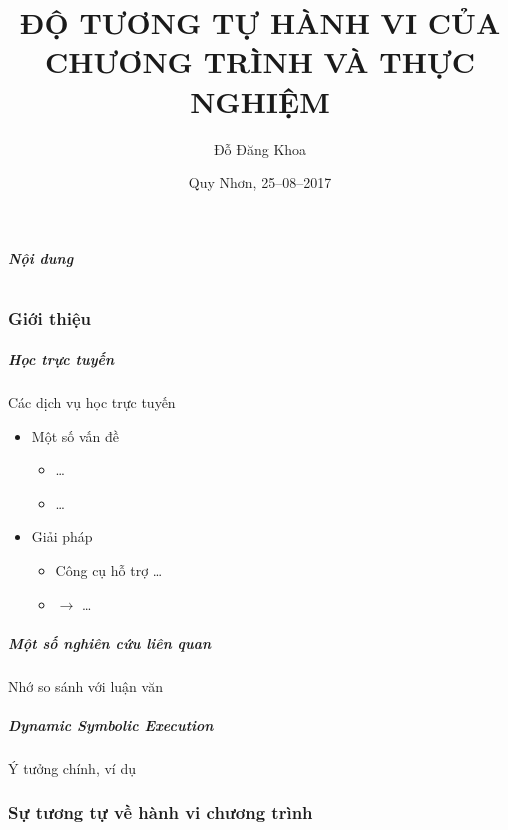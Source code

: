 \documentclass{beamer}
\title{ĐỘ TƯƠNG TỰ HÀNH VI CỦA CHƯƠNG TRÌNH VÀ THỰC NGHIỆM}
\author{Đỗ Đăng Khoa}
\institute{KHMT K19 -- ĐHQN}
\date{Quy Nhơn, 25--08--2017}
\begin{document}
\begin{frame}
  \titlepage
\end{frame}

\begin{frame}
  \frametitle{Nội dung}
  \tableofcontents{}
\end{frame}

\part{}

\section{Giới thiệu}

\begin{frame}
  \frametitle{Học trực tuyến}
  \begin{minipage}{0.45\linewidth}
    Các dịch vụ học trực tuyến
  \end{minipage}
  \hfill
  \begin{minipage}{0.45\linewidth}
    \begin{itemize}
    \item Một số vấn đề
      \begin{itemize}
      \item \dots
      \item \dots
      \end{itemize}
    \item Giải pháp
      \begin{itemize}
      \item Công cụ hỗ trợ \dots
      \item $\rightarrow$ \dots
      \end{itemize}
  \end{itemize}

  \end{minipage}
\end{frame}


\begin{frame}
  \frametitle{Một số nghiên cứu liên quan}
  Nhớ so sánh với luận văn
\end{frame}

\begin{frame}
  \frametitle{Dynamic Symbolic Execution}
  Ý tưởng chính, ví dụ
\end{frame}

\section{Sự tương tự về hành vi chương trình}
\end{document}
